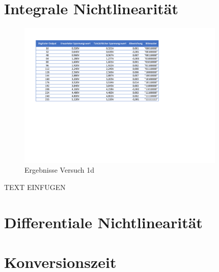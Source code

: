 \section{Integrale Nichtlinearität}


\begin{figure}[H]
	\centering
	\includegraphics[height=7cm]{images/Versuch-1d.pdf} 
	\caption[]{Ergebnisse Versuch 1d}
\end{figure}

TEXT EINFUGEN

\section{Differentiale Nichtlinearität}
\section{Konversionszeit}
